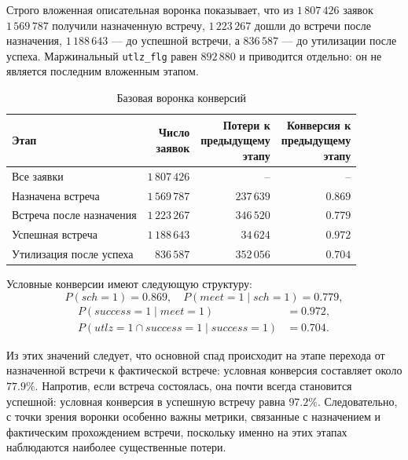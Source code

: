 \documentclass[14pt,a4paper]{extarticle}
\begin{document}
Строго вложенная описательная воронка показывает, что из \(1\,807\,426\) заявок \(1\,569\,787\) получили назначенную встречу, \(1\,223\,267\) дошли до встречи после назначения, \(1\,188\,643\) --- до успешной встречи, а \(836\,587\) --- до утилизации после успеха. Маржинальный \texttt{utlz\_flg} равен \(892\,880\) и приводится отдельно: он не является последним вложенным этапом.

\begin{table}[H]
    \centering
    \caption{Базовая воронка конверсий}
    \label{tab:conversion_funnel}
    \small
    \begin{tabular}{@{}lrrr@{}}
        \toprule
        Этап
        & \shortstack{Число\\заявок}
        & \shortstack{Потери к\\предыдущему\\этапу}
        & \shortstack{Конверсия к\\предыдущему\\этапу} \\
        \midrule
        Все заявки
        & \(1\,807\,426\)
        & --
        & -- \\

        Назначена встреча
        & \(1\,569\,787\)
        & \(237\,639\)
        & \(0.869\) \\

        Встреча после назначения
        & \(1\,223\,267\)
        & \(346\,520\)
        & \(0.779\) \\

        Успешная встреча
        & \(1\,188\,643\)
        & \(34\,624\)
        & \(0.972\) \\

        Утилизация после успеха
        & \(836\,587\)
        & \(352\,056\)
        & \(0.704\) \\
        \bottomrule
    \end{tabular}
\end{table}

Условные конверсии имеют следующую структуру:
\[
P(sch=1)=0.869, \quad P(meet=1 \mid sch=1)=0.779,
\]
\begin{align*}
P(success=1 \mid meet=1)&=0.972,\\
P(utlz=1 \cap success=1 \mid success=1)&=0.704.
\end{align*}

Из этих значений следует, что основной спад происходит на этапе перехода от назначенной встречи к фактической встрече: условная конверсия составляет около \(77.9\%\). Напротив, если встреча состоялась, она почти всегда становится успешной: условная конверсия в успешную встречу равна \(97.2\%\). Следовательно, с точки зрения воронки особенно важны метрики, связанные с назначением и фактическим прохождением встречи, поскольку именно на этих этапах наблюдаются наиболее существенные потери.
\end{document}
